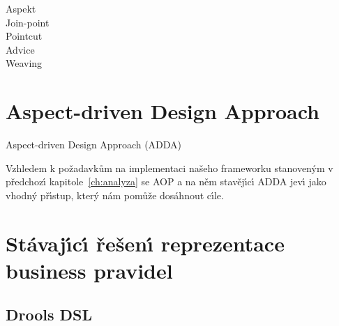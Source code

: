 
\begin{description}
    \item [Aspekt]
    \item [Join-point]
    \item [Pointcut]
    \item [Advice]
    \item [Weaving]
\end{description}

\section{Aspect-driven Design Approach}


Aspect-driven Design Approach (\gls{ADDA})

Vzhledem k požadavkům na implementaci našeho frameworku stanoven\'ym
v předchoz\'{\i} kapitole~\ref{ch:analyza} se \gls{AOP} a na něm stavěj\'{\i}c\'{\i} \gls{ADDA}
jev\'{\i} jako vhodn\'y př\'{\i}stup, kter\'y nám pomůže dosáhnout c\'{\i}le.

\section{Stávaj\'{\i}c\'{\i} řešen\'{\i} reprezentace business pravidel}

\subsection{Drools DSL}


